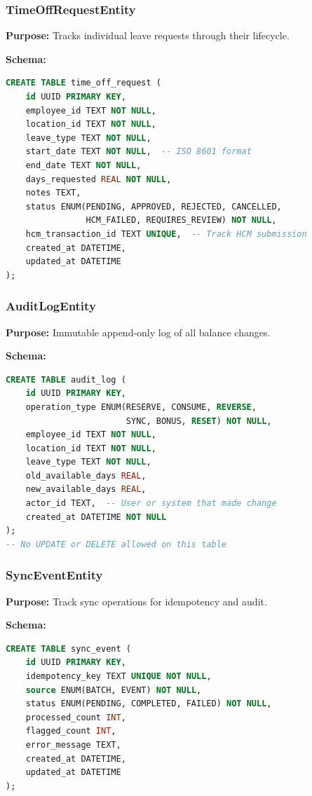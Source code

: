 \documentclass[12pt,a4paper]{article}
\begin{document}
\subsubsection{TimeOffRequestEntity}

\textbf{Purpose:} Tracks individual leave requests through their lifecycle.

\textbf{Schema:}
\begin{lstlisting}[language=SQL]
CREATE TABLE time_off_request (
    id UUID PRIMARY KEY,
    employee_id TEXT NOT NULL,
    location_id TEXT NOT NULL,
    leave_type TEXT NOT NULL,
    start_date TEXT NOT NULL,  -- ISO 8601 format
    end_date TEXT NOT NULL,
    days_requested REAL NOT NULL,
    notes TEXT,
    status ENUM(PENDING, APPROVED, REJECTED, CANCELLED, 
                HCM_FAILED, REQUIRES_REVIEW) NOT NULL,
    hcm_transaction_id TEXT UNIQUE,  -- Track HCM submission
    created_at DATETIME,
    updated_at DATETIME
);
\end{lstlisting}

\subsubsection{AuditLogEntity}

\textbf{Purpose:} Immutable append-only log of all balance changes.

\textbf{Schema:}
\begin{lstlisting}[language=SQL]
CREATE TABLE audit_log (
    id UUID PRIMARY KEY,
    operation_type ENUM(RESERVE, CONSUME, REVERSE, 
                        SYNC, BONUS, RESET) NOT NULL,
    employee_id TEXT NOT NULL,
    location_id TEXT NOT NULL,
    leave_type TEXT NOT NULL,
    old_available_days REAL,
    new_available_days REAL,
    actor_id TEXT,  -- User or system that made change
    created_at DATETIME NOT NULL
);
-- No UPDATE or DELETE allowed on this table
\end{lstlisting}

\subsubsection{SyncEventEntity}

\textbf{Purpose:} Track sync operations for idempotency and audit.

\textbf{Schema:}
\begin{lstlisting}[language=SQL]
CREATE TABLE sync_event (
    id UUID PRIMARY KEY,
    idempotency_key TEXT UNIQUE NOT NULL,
    source ENUM(BATCH, EVENT) NOT NULL,
    status ENUM(PENDING, COMPLETED, FAILED) NOT NULL,
    processed_count INT,
    flagged_count INT,
    error_message TEXT,
    created_at DATETIME,
    updated_at DATETIME
);
\end{lstlisting}
\end{document}
